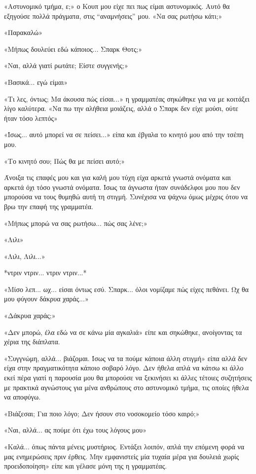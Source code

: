 \documentclass[12pt,twoside, openany]{book}
\begin{document}
«Αστυνομικό τμήμα, ε;» ο Κουπ μου είχε πει πως είμαι αστυνομικός. Αυτό θα εξηγούσε πολλά πράγματα, στις “αναμνήσεις” μου. «Να σας ρωτήσω κάτι;»

«Παρακαλώ»

«Μήπως δουλεύει εδώ κάποιος... Σπαρκ Θοτς;»

«Ναι, αλλά γιατί ρωτάτε; Είστε συγγενής;»

«Βασικά... εγώ είμαι»

«Τι λες, όντως; Μα άκουσα πώς είσαι...» η γραμματέας σηκώθηκε για να με κοιτάξει λίγο καλύτερα. «Να πω την αλήθεια μοιάζεις, αλλά ο Σπαρκ δεν είχε μούσι, ούτε ήταν τόσο λεπτός»

«Ίσως... αυτό μπορεί να σε πείσει...» είπα και έβγαλα το κινητό μου από την τσέπη μου.

«Το κινητό σου; Πώς θα με πείσει αυτό;»

Άνοιξα τις επαφές μου και για καλή μου τύχη είχα αρκετά γνωστά ονόματα και αρκετά όχι τόσο γνωστά ονόματα. Ίσως τα άγνωστα ήταν συνάδελφοι μου που δεν μπορούσα να τους θυμηθώ αυτή τη στιγμή. Συνέχισα να ψάχνω όμως μέχρις ότου να βρω την επαφή της γραμματέα.

«Μήπως μπορώ να σας ρωτήσω... πώς σας λένε;»

«Λιλι»

«Λιλι, Λιλι...»

*ντριν ντριν... ντριν ντριν...*

«Μίσο λεπ... ωχ... είσαι όντως εσύ. Σπαρκ... όλοι νομίζαμε πώς είχες πεθάνει. Ωχ θα μου φύγουν δάκρυα χαράς...»

«Δάκρυα χαράς;»

«Δεν μπορώ, έλα εδώ να σε κάνω μία αγκαλιά» είπε και σηκώθηκε, ανοίγοντας τα χέρια της διάπλατα.

«Συγγνώμη, αλλά... βιάζομαι. Ίσως να τα πούμε κάποια άλλη στιγμή» είπα αλλά δεν είχα στην πραγματικότητα κάποιο σοβαρό λόγο. Δεν ήθελα απλά να κάτσω κι άλλο εκεί πέρα γιατί η παρουσία μου θα μπορούσε να ξεκινήσει κι άλλες τέτοιες συζητήσεις με πρακτικά αγνώστους για μένα ανθρώπους στο αστυνομικό τμήμα, τις οποίες ήθελα να αποφύγω.

«Βιάζεσαι; Για ποιο λόγο; Δεν ήσουν στο νοσοκομείο τόσο καιρό;»

«Ναι, αλλά... ας πούμε ότι έχω τους λόγους μου»

«Καλά... όπως πάντα μένεις μυστήριος. Εντάξει λοιπόν, απλά την επόμενη φορά να μας ενημερώσεις πριν έρθεις. Μην εμφανιστείς μία τυχαία μέρα για δουλειά χωρίς προειδοποίηση» είπε και γέλασε μόνη της η γραμματέας.
\end{document}
